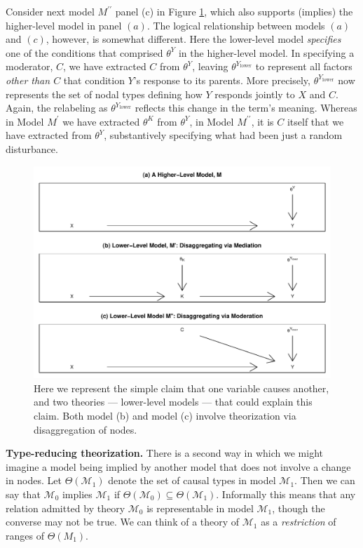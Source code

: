 \documentclass[
  12pt,
]{book}
\begin{document}
Consider next model \(M^{\prime\prime}\) panel (c) in Figure \ref{fig:Highlow}, which also supports (implies) the higher-level model in panel \((a)\). The logical relationship between models \((a)\) and \((c)\), however, is somewhat different. Here the lower-level model \emph{specifies} one of the conditions that comprised \(\theta^Y\) in the higher-level model. In specifying a moderator, \(C\), we have extracted \(C\) from \(\theta^Y\), leaving \(\theta^{Y_\text{lower}}\) to represent all factors \emph{other than \(C\)} that condition \(Y\)'s response to its parents. More precisely, \(\theta^{Y_\text{lower}}\) now represents the set of nodal types defining how \(Y\) responds jointly to \(X\) and \(C\). Again, the relabeling as \(\theta^{Y_\text{lower}}\) reflects this change in the term's meaning. Whereas in Model \(M^{\prime}\) we have extracted \(\theta^K\) from \(\theta^Y\), in Model \(M^{\prime\prime}\), it is \(C\) itself that we have extracted from \(\theta^Y\), substantively specifying what had been just a random disturbance.

\begin{figure}

{\centering \includegraphics[width=0.8\linewidth]{ii_files/figure-latex/Highlow-1} 

}

\caption{Here we represent the simple claim that one variable causes another, and two theories --- lower-level models --- that could explain this claim. Both model (b) and model (c) involve theorization via disaggregation of nodes.}\label{fig:Highlow}
\end{figure}

\textbf{Type-reducing theorization.} There is a second way in which we might imagine a model being implied by another model that does not involve a change in nodes. Let \(\Theta(\mathcal M_1)\) denote the set of causal types in model \(\mathcal M_1\). Then we can say that \(\mathcal M_0\) implies \(\mathcal M_1\) if \(\Theta(\mathcal M_0)\subseteq \Theta(\mathcal M_1)\). Informally this means that any relation admitted by theory \(\mathcal M_0\) is representable in model \(\mathcal M_1\), though the converse may not be true. We can think of a theory of \(\mathcal M_1\) as a \emph{restriction} of ranges of \(\Theta(M_1)\).
\end{document}
